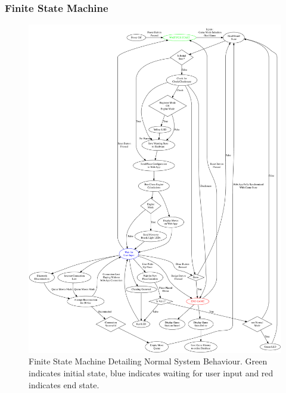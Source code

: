 \documentclass[12pt]{article}
\begin{document}
\subsubsection{Finite State Machine}{
\begin{figure}[H]
    \begin{center}
      \includegraphics[scale=0.30]{chess-connect-FSM.pdf}
      \caption{Finite State Machine Detailing Normal System Behaviour. Green indicates initial state, blue indicates waiting for user input and red indicates end state.}
      \label{Fig_FSM} 
    \end{center}
  \end{figure}
}
\end{document}
